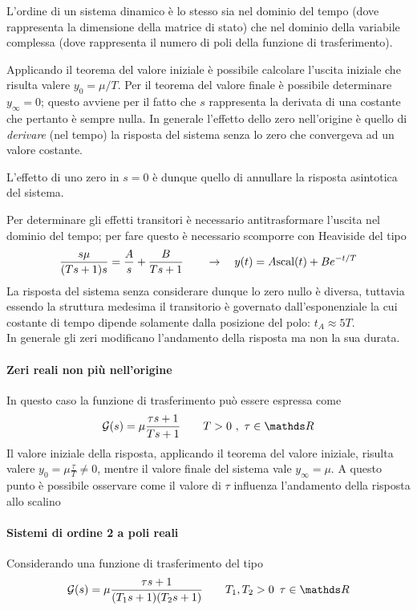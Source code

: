 		\begin{nota}
			L'ordine di un sistema dinamico è lo stesso sia nel dominio del tempo (dove rappresenta la dimensione della matrice di stato) che nel dominio della variabile complessa (dove rappresenta il numero di poli della funzione di trasferimento).
		\end{nota}
		Applicando il teorema del valore iniziale è possibile calcolare l'uscita iniziale che risulta valere $y_0 = \mu / T$. Per il teorema del valore finale è possibile determinare $y_\infty = 0$; questo avviene per il fatto che $s$ rappresenta la derivata di una costante che pertanto è sempre nulla. In generale l'effetto dello zero nell'origine è quello di \textit{derivare} (nel tempo) la risposta del sistema senza lo zero che convergeva ad un valore costante.
		
		L'effetto di uno zero in $s=0$ è dunque quello di annullare la risposta asintotica del sistema.
		
		Per determinare gli effetti transitori è necessario antitrasformare l'uscita nel dominio del tempo; per fare questo è necessario scomporre con Heaviside del tipo
		\[ \frac{s\mu}{(Ts+1)s} = \frac A s + \frac B {Ts+1} \qquad \rightarrow \quad y(t) = A \textrm{scal}(t) + B e^{-t/T}\]
		La risposta del sistema senza considerare dunque lo zero nullo è diversa, tuttavia essendo la struttura medesima il transitorio è governato dall'esponenziale la cui costante di tempo dipende solamente dalla posizione del polo: $t_A \approx 5T$. \\
		In generale gli zeri modificano l'andamento della risposta ma non la sua durata.
		
		\paragraph{Zeri reali non più nell'origine} In questo caso la funzione di trasferimento può essere espressa come
		\[ \G(s) = \mu \frac{\tau s + 1}{Ts+1} \qquad T > 0 \ , \ \tau \in\mathds R\]
		Il valore iniziale della risposta, applicando il teorema del valore iniziale, risulta valere $y_0 = \mu \frac \tau T \neq 0$, mentre il valore finale del sistema vale $y_\infty = \mu$. A questo punto è possibile osservare come il valore di $\tau$ influenza l'andamento della risposta allo scalino
		
		\paragraph{Sistemi di ordine 2 a poli reali} Considerando una funzione di trasferimento del tipo
		\[ \G(s) = \mu \frac{\tau s + 1}{(T_1 s + 1)(T_2 s + 1)} \qquad T_1,T_2 > 0\, \ \tau\in \mathds R  \]
		
